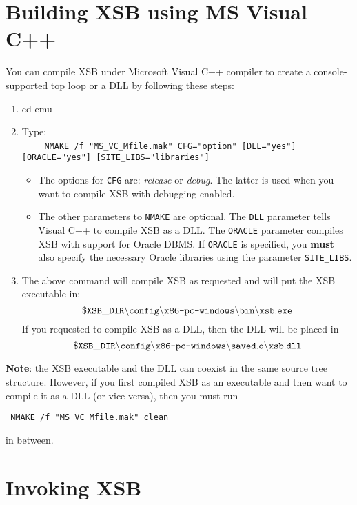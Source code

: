 \section{Building XSB using MS Visual C++}

You can compile XSB under Microsoft Visual C++ compiler 
to create a console-supported top loop or a DLL by following
these steps:

\begin{enumerate}

\item
   cd emu

\item
  Type:\\
  ~~~~ {\tt NMAKE /f "MS\_VC\_Mfile.mak" CFG="option" [DLL="yes"] [ORACLE="yes"] [SITE\_LIBS="libraries"]}
  \begin{itemize}
    \item  The options for {\tt CFG} are: \emph{release} or \emph{debug}.
      The latter is used when you want to compile XSB with debugging
      enabled.
    \item The other parameters to {\tt NMAKE} are optional. The {\tt DLL}
      parameter tells Visual C++ to compile XSB as a DLL. The {\tt ORACLE}
      parameter compiles XSB with support for Oracle DBMS. If {\tt ORACLE} is
      specified, you {\bf must} also specify the necessary Oracle libraries
      using the parameter {\tt SITE\_LIBS}.
  \end{itemize}
   
 \item The above command will compile XSB as requested and will put the XSB 
   executable in:
\[
 \tt
 \$XSB\_DIR\backslash config\backslash \mbox{\tt x86-pc-windows}\backslash bin
 \backslash xsb.exe
\]
   If you requested to compile XSB as a DLL, then the DLL will be placed in
\[
 \tt
 \$XSB\_DIR\backslash config\backslash \mbox{\tt x86-pc-windows}\backslash
 saved.o \backslash xsb.dll
\]
\end{enumerate}
{\bf Note}: the XSB executable and the DLL can coexist in the same source
tree structure. However, if you first compiled  XSB as an executable and
then want to compile it as a DLL (or vice versa), then you must run 
\begin{verbatim}
 NMAKE /f "MS_VC_Mfile.mak" clean  
\end{verbatim}
in between.


\section{Invoking XSB}

